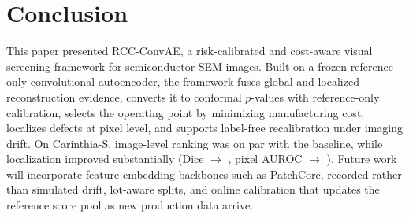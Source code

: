\documentclass[conference]{IEEEtran}
\begin{document}
\section{Conclusion}
This paper presented RCC-ConvAE, a risk-calibrated and cost-aware visual screening framework for semiconductor SEM images. Built on a frozen reference-only convolutional autoencoder, the framework fuses global and localized reconstruction evidence, converts it to conformal $p$-values with reference-only calibration, selects the operating point by minimizing manufacturing cost, localizes defects at pixel level, and supports label-free recalibration under imaging drift. On Carinthia-S, image-level ranking was on par with the baseline, while localization improved substantially (Dice \PoneDice{} $\rightarrow$ \PtwoDice{}, pixel AUROC \PonePixAUC{} $\rightarrow$ \PtwoPixAUC{}). Future work will incorporate feature-embedding backbones such as PatchCore, recorded rather than simulated drift, lot-aware splits, and online calibration that updates the reference score pool as new production data arrive.



\end{document}
